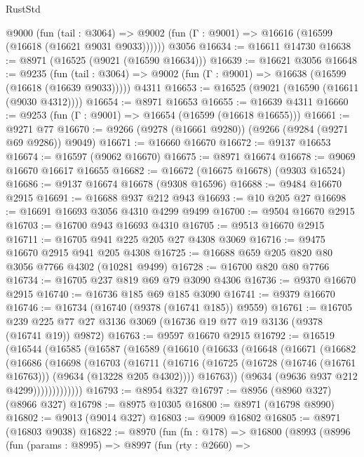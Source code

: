 \begin{lexlean}{RustStd}
\begin{coremodule}
    @9000
      (fun (tail : @3064) =>
      @9002 (fun (Γ : @9001) => @16616 (@16599 (@16618 (@16621 @9031 @9033))))))
    @3056
@16634 := @16611 @14730
@16638 := @8971 (@16525 (@9021 (@16590 @16634)))
@16639 := @16621 @3056
@16648 := @9235
    (fun (tail : @3064) => @9002 (fun (Γ : @9001) => @16638 (@16599 (@16618 (@16639 @9033)))))
    @4311
@16653 := @16525 (@9021 (@16590 (@16611 (@9030 @4312))))
@16654 := @8971 @16653
@16655 := @16639 @4311
@16660 := @9253 (fun (Γ : @9001) => @16654 (@16599 (@16618 @16655)))
@16661 := @9271 @77
@16670 := @9266 (@9278 (@16661 @9280)) (@9266 (@9284 (@9271 @69 @9286)) @9049)
@16671 := @16660 @16670
@16672 := @9137 @16653
@16674 := @16597 (@9062 @16670)
@16675 := @8971 @16674
@16678 := @9069 @16670 @16617 @16655
@16682 := @16672 (@16675 @16678) (@9303 @16524)
@16686 := @9137 @16674 @16678 (@9308 @16596)
@16688 := @9484 @16670 @2915
@16691 := @16688 @937 @212 @943
@16693 := @10 @205 @27
@16698 := @16691 @16693 @3056 @4310 @4299 @9499
@16700 := @9504 @16670 @2915
@16703 := @16700 @943 @16693 @4310
@16705 := @9513 @16670 @2915
@16711 := @16705 @941 @225 @205 @27 @4308 @3069
@16716 := @9475 @16670 @2915 @941 @205 @4308
@16725 := @16688 @659 @205 @820 @80 @3056 @7766 @4302 (@10281 @9499)
@16728 := @16700 @820 @80 @7766
@16734 := @16705 @237 @819 @69 @79 @3090 @4306
@16736 := @9370 @16670 @2915
@16740 := @16736 @185 @69 @185 @3090
@16741 := @9379 @16670
@16746 := @16734 (@16740 (@9378 (@16741 @185)) @9559)
@16761 := @16705 @239 @225 @77 @27 @3136 @3069 (@16736 @19 @77 @19 @3136 (@9378 (@16741 @19)) @9872)
@16763 := @9597 @16670 @2915
@16792 := @16519
    (@16544
      (@16585
        (@16587
          (@16589
            (@16610
              (@16633
                (@16648
                  (@16671
                    (@16682
                      (@16686
                        (@16698
                          (@16703
                            (@16711
                              (@16716
                                (@16725
                                  (@16728 (@16746 (@16761 @16763)))
                                  (@9634 (@13228 @205 @4302))))
                              @16763))
                          (@9634 (@9636 @937 @212 @4299)))))))))))))
@16793 := @8954 @327
@16797 := @8956 (@8960 @327) (@8966 @327)
@16798 := @8975 @10305
@16800 := @8971 (@16798 @8990)
@16802 := @9013 (@9014 @327)
@16803 := @9009 @16802
@16805 := @8971 (@16803 @9038)
@16822 := @8970
    (fun (fn : @178) =>
    @16800
      (@8993
        (@8996
          (fun (params : @8995) =>
          @8997
            (fun (rty : @2660) =>

\end{coremodule}
\end{lexlean}
